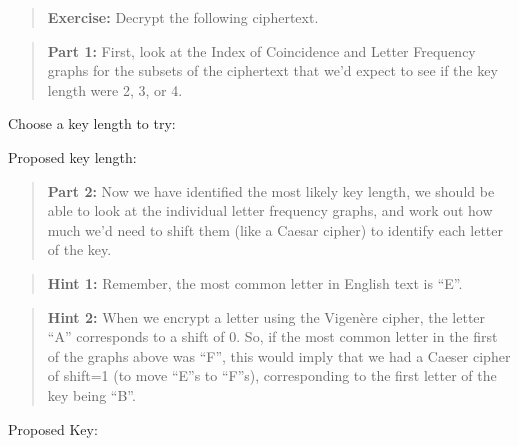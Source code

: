 \documentclass[
  letterpaper,
  DIV=11,
  numbers=noendperiod]{scrreprt}
\begin{document}
\begin{quote}
\textbf{Exercise:} Decrypt the following ciphertext.
\end{quote}

\hypertarget{vig-challenge}{}

\begin{quote}
\textbf{Part 1:} First, look at the Index of Coincidence and Letter
Frequency graphs for the subsets of the ciphertext that we'd expect to
see if the key length were 2, 3, or 4.
\end{quote}

Choose a key length to try:

\leavevmode{}%
Proposed key length:

\hypertarget{vig-grid}{}
\hypertarget{vigtext-1}{}
\hypertarget{vigtext-1-text}{}

\hypertarget{vigplot-1}{}

\hypertarget{vigtext-2}{}
\hypertarget{vigtext-2-text}{}

\hypertarget{vigplot-2}{}

\hypertarget{vigtext-3}{}
\hypertarget{vigtext-3-text}{}

\hypertarget{vigplot-3}{}

\hypertarget{vigtext-4}{}
\hypertarget{vigtext-4-text}{}

\hypertarget{vigplot-4}{}

\begin{quote}
\textbf{Part 2:} Now we have identified the most likely key length, we
should be able to look at the individual letter frequency graphs, and
work out how much we'd need to shift them (like a Caesar cipher) to
identify each letter of the key.
\end{quote}

\begin{quote}
\textbf{Hint 1:} Remember, the most common letter in English text is
``E''.
\end{quote}

\begin{quote}
\textbf{Hint 2:} When we encrypt a letter using the Vigenère cipher, the
letter ``A'' corresponds to a shift of 0. So, if the most common letter
in the first of the graphs above was ``F'', this would imply that we had
a Caeser cipher of shift=1 (to move ``E''s to ``F''s), corresponding to
the first letter of the key being ``B''.
\end{quote}

Proposed Key:
\end{document}
